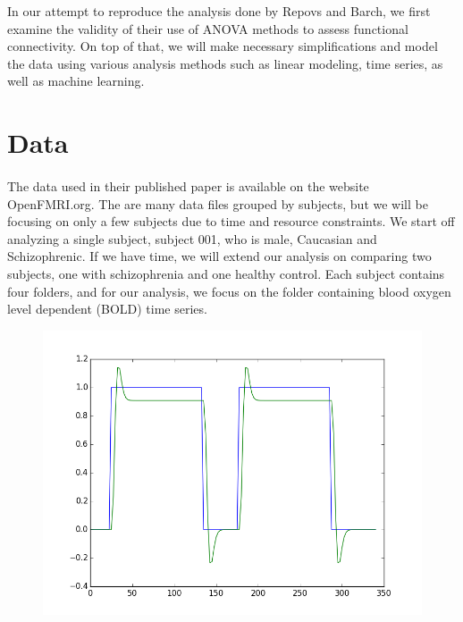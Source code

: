 \documentclass[11pt]{article}
\begin{document}
In our attempt to reproduce the analysis done by Repovs and Barch, we first
examine the validity of their use of ANOVA methods to assess functional
connectivity. On top of that, we will make necessary simplifications and model
the data using various analysis methods such as linear modeling, time series,
as well as machine learning. \par

\section{Data}
\paragraph{}
The data used in their published paper is available on the website
OpenFMRI.org. The are many data files grouped by subjects, but we will be
focusing on only a few subjects due to time and resource constraints. We start
off analyzing a single subject, subject 001, who is male, Caucasian and
Schizophrenic. If we have time, we will extend our analysis on comparing two
subjects, one with schizophrenia and one healthy control. Each subject contains
four folders, and for our analysis, we focus on the folder containing blood
oxygen level dependent (BOLD) time series. \par

\begin{figure}[!htb]
    \includegraphics[width=\linewidth]{task001_run001_conv005}
\end{figure}
\end{document}
